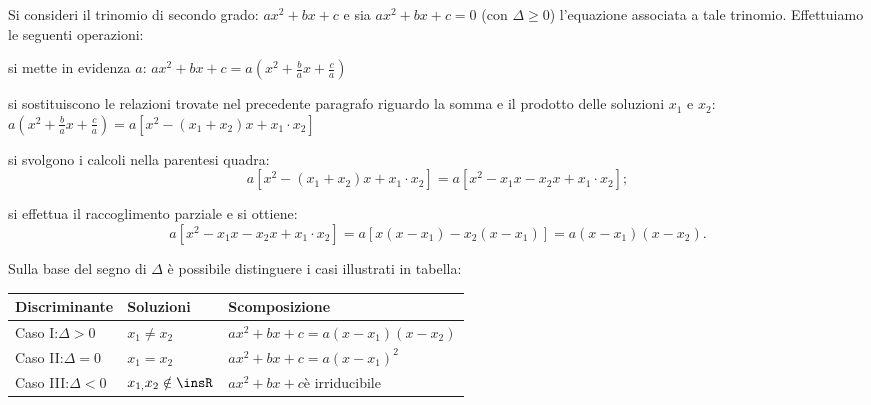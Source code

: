 Si consideri il trinomio di secondo grado: $a x^{2} + b x + c$ e sia $a x^{2} + 
b x + c = 0$ (con $\Delta \geq 0$) l'equazione associata a tale trinomio. 
Effettuiamo le seguenti operazioni:
\begin{itemize*}
\item si mette in evidenza $a$: $a x^{2} + b x + c = a \left( x^{2} + 
\frac{b}{a} x + \frac{c}{a} \right)$
\item si sostituiscono le relazioni trovate nel precedente paragrafo riguardo 
la 
somma e il prodotto delle soluzioni $x_{1}$ e $x_{2}$: $a \left( x^{2} + 
\frac{b}{a} x + \frac{c}{a} \right) = a \left[x^{2} - ( x_{1} + x_{2} ) x + 
x_{1} \cdot x_{2} \right]$
\item si svolgono i calcoli nella parentesi quadra:
\[a \left[ x^{2} - ( x_{1} + x_{2} ) x + x_{1} \cdot x_{2}\right] = a\left[ 
x^{2} - x_{1} x - x_{2} x + x_{1} \cdot x_{2}\right];\]
\item si effettua il raccoglimento parziale e si ottiene:
\[a \left[x^{2} - x_{1} x - x_{2} x + x_{1} \cdot x_{2}\right] = a \left[ {x 
\left(x - x_{1} \right) - x_{2} \left( x - x_{1}\right)}\right] = a \left( x - 
x_{1} \right) \left( x - x_{2} \right).\]
\end{itemize*}

Sulla base del segno di $\Delta$ è possibile distinguere i casi illustrati in 
tabella:
\begin{center}
\begin{tabular*}{.9\textwidth}{@{\extracolsep{\fill}}*{3}{l}}
\toprule
Discriminante & Soluzioni & Scomposizione \\
\midrule
Caso I:\quad $\Delta > 0$ & $x_{1} \neq x_{2}$ & $a x^{2} + b x + c=a ( x - 
x_{1} ) ( x - x_{2} )$\\
Caso II:\quad $\Delta = 0$ & $x_{1} = x_{2}$ & $a x^{2} + b x + c=a ( x - x_{1} 
)^{2}$ \\
Caso III:\quad $\Delta < 0$ & $x_{1,} x_{2} \notin \insR$ & $a x^{2} + b x + 
c$\quad è irriducibile \\
\end{tabular*}
\end{center}

